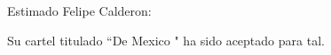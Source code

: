 \documentclass{article}
\begin{document}
Estimado Felipe Calderon:

Su cartel titulado ``De Mexico
" ha sido aceptado para tal.
\end{document}
